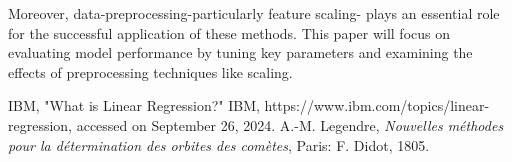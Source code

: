 \documentclass{article}
\begin{document}
Moreover, data-preprocessing-particularly feature scaling- plays an essential role for the successful application of these methods.  
This paper will focus on evaluating model performance by tuning key parameters and examining the effects of preprocessing techniques 
like scaling.
\begin{thebibliography}{1}
    \addtolength{\leftmargin}{0.2in} 
    IBM, "What is Linear Regression?" IBM, https://www.ibm.com/topics/linear-regression, accessed on September 26, 2024.
    A.-M. Legendre, \textit{Nouvelles méthodes pour la détermination des orbites des comètes}, Paris: F. Didot, 1805.
\end{thebibliography}
\end{document}
